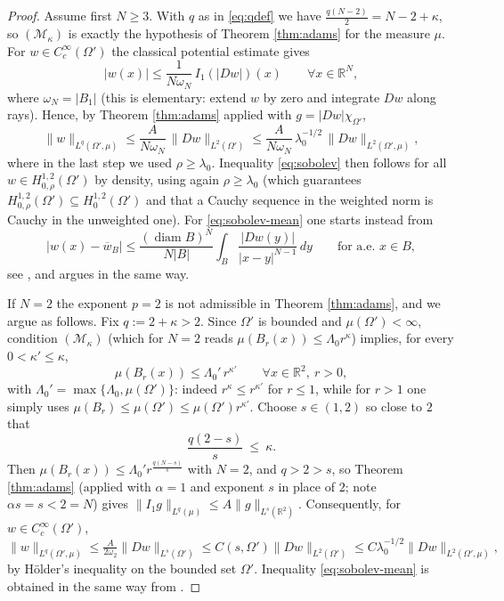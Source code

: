 \documentclass[reqno]{amsart}
\theoremstyle{plain}
\theoremstyle{definition}
\theoremstyle{remark}
\newcommand{\R}{\mathbb{R}}
\begin{document}
\begin{proof}
Assume first $N\ge3$. With $q$ as in \eqref{eq:qdef} we have $\frac{q(N-2)}{2}=N-2+\kappa$, so
$(\mathcal M_\kappa)$ is exactly the hypothesis of Theorem \ref{thm:adams} for the measure $\mu$.
For $w\in C_c^\infty(\Omega')$ the classical potential estimate gives
\[
|w(x)|\le\frac{1}{N\omega_N}\,I_1(|Dw|)(x)\qquad\forall x\in\R^N,
\]
where $\omega_N=|B_1|$ (this is elementary: extend $w$ by zero and integrate $Dw$ along rays). Hence, by Theorem \ref{thm:adams} applied with
$g=|Dw|\chi_{\Omega'}$,
\[
\|w\|_{L^q(\Omega',\mu)}\le \frac{A}{N\omega_N}\,\|Dw\|_{L^2(\Omega')}
\le \frac{A}{N\omega_N}\,\lambda_0^{-1/2}\,\|Dw\|_{L^2(\Omega',\mu)} ,
\]
where in the last step we used $\rho\ge\lambda_0$. Inequality \eqref{eq:sobolev} then follows for
all $w\in H^{1,2}_{0,\rho}(\Omega')$ by density, using again $\rho\ge\lambda_0$ (which guarantees
$H^{1,2}_{0,\rho}(\Omega')\subseteq H^{1,2}_0(\Omega')$ and that a Cauchy sequence in the weighted
norm is Cauchy in the unweighted one). For \eqref{eq:sobolev-mean} one starts instead from
\[
|w(x)-\overline w_B|\le\frac{(\operatorname{diam}B)^N}{N|B|}\int_B\frac{|Dw(y)|}{|x-y|^{N-1}}\,dy
\qquad\text{for a.e. }x\in B,
\]
see \cite[Lemma 7.16]{GT}, and argues in the same way.

If $N=2$ the exponent $p=2$ is not admissible in Theorem \ref{thm:adams}, and we argue as follows.
Fix $q:=2+\kappa>2$. Since $\Omega'$ is bounded and $\mu(\Omega')<\infty$, condition
$(\mathcal M_\kappa)$ (which for $N=2$ reads $\mu(B_r(x))\le\Lambda_0r^{\kappa}$) implies, for every
$0<\kappa'\le\kappa$,
\[
\mu(B_r(x))\le\Lambda_0'\,r^{\kappa'}\qquad\forall x\in\R^2,\ r>0 ,
\]
with $\Lambda_0'=\max\{\Lambda_0,\mu(\Omega')\}$: indeed $r^{\kappa}\le r^{\kappa'}$ for $r\le1$,
while for $r>1$ one simply uses $\mu(B_r)\le\mu(\Omega')\le\mu(\Omega')r^{\kappa'}$. Choose
$s\in(1,2)$ so
close to $2$ that
\[
\frac{q(2-s)}{s}\ \le\ \kappa .
\]
Then $\mu(B_r(x))\le\Lambda_0'r^{\frac{q(N-s)}{s}}$ with $N=2$, and $q>2>s$, so Theorem
\ref{thm:adams} (applied with $\alpha=1$ and exponent $s$ in place of $2$; note $\alpha s=s<2=N$)
gives $\|I_1g\|_{L^q(\mu)}\le A\|g\|_{L^s(\R^2)}$. Consequently, for $w\in C_c^\infty(\Omega')$,
\[
\|w\|_{L^q(\Omega',\mu)}\le \tfrac{A}{2\omega_2}\|Dw\|_{L^{s}(\Omega')}
\le C(s,\Omega')\|Dw\|_{L^2(\Omega')}\le C\lambda_0^{-1/2}\|Dw\|_{L^2(\Omega',\mu)} ,
\]
by H\"older's inequality on the bounded set $\Omega'$. Inequality \eqref{eq:sobolev-mean} is
obtained in the same way from \cite[Lemma 7.16]{GT}.
\end{proof}
\end{document}
